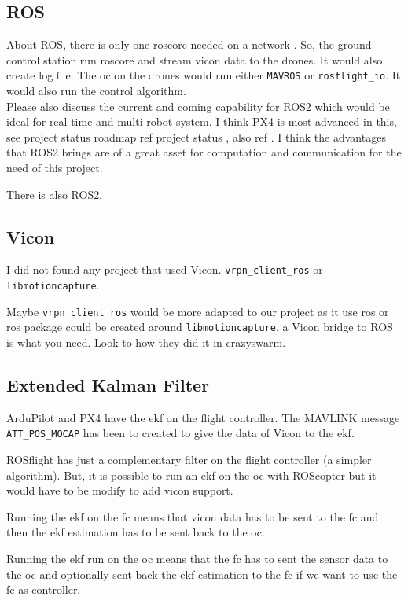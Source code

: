 \subsection{ROS}
About ROS, there is only one roscore needed on a network \cite{stackoverflow_multi_machine}.
So, the ground control station run roscore and stream vicon data to the drones. It would also create log file.
The \gls{oc} on the drones would run either \texttt{MAVROS} or \texttt{rosflight\_io}.
It would also run the control algorithm.
{\color{red} \\Please also discuss the current and coming capability for ROS2 which would be ideal for real-time and multi-robot system. I think PX4 is most advanced in this, see project status roadmap ref project status \cite{px4}, also ref \cite{ros_wiki_ng_drones}. I think the advantages that ROS2 brings are of a great asset for computation and communication for the need of this project.\\}

There is also ROS2,

\subsection{Vicon}
I did not found any project that used Vicon.
\texttt{vrpn\_client\_ros} or \texttt{libmotioncapture}.

Maybe \texttt{vrpn\_client\_ros} would be more adapted to our project as it use ros or ros package could be created around \texttt{libmotioncapture}.
{\color{red}a Vicon bridge to ROS is what you need. Look to how they did it in crazyswarm.}

\subsection{Extended Kalman Filter}
ArduPilot and PX4 have the \gls{ekf} on the flight controller.
The MAVLINK message \texttt{ATT\_POS\_MOCAP} has been to created to give the data of Vicon to the \gls{ekf}.

ROSflight has just a complementary filter on the flight controller (a simpler algorithm).
But, it is possible to run an \gls{ekf} on the \gls{oc} with ROScopter but it would have to be modify to add vicon support.

Running the \gls{ekf} on the \gls{fc} means that vicon data has to be sent to the \gls{fc} and then the \gls{ekf} estimation has to be sent back to the \gls{oc}.

Running the \gls{ekf} run on the \gls{oc} means that the \gls{fc} has to sent the sensor data to the \gls{oc} and optionally sent back the \gls{ekf} estimation to the \gls{fc} if we want to use the \gls{fc} as controller.


